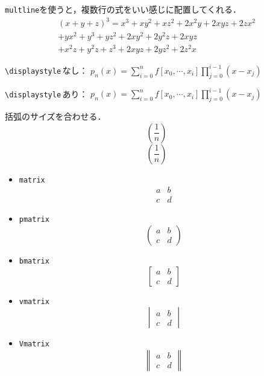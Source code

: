 \documentclass[uplatex]{jsarticle}
\begin{document}
\verb|multline|を使うと，複数行の式をいい感じに配置してくれる．
\begin{multline}
(x+y+z)^3=x^3+xy^2+xz^2+2x^2y+2xyz+2zx^2\\
+yx^2+y^3+yz^2+2xy^2+2y^2z+2xyz\\
+x^2z+y^2z+z^3+2xyz+2yz^2+2z^2x
\end{multline}

\verb|\displaystyle|\,なし：
$p_n(x) =\sum_{i=0}^n f[x_0,\cdots,x_i] \prod_{j=0}^{i-1}(x-x_j)$

\verb|\displaystyle|\,あり：
$\displaystyle p_n(x) =\sum_{i=0}^n f[x_0,\cdots,x_i] \prod_{j=0}^{i-1}(x-x_j)$

括弧のサイズを合わせる．
\begin{equation}
    (\frac{1}{n})
\end{equation}
\begin{equation}
    \left(\frac{1}{n}\right)
\end{equation}

\begin{itemize}
    \item \verb|matrix|
    \begin{equation}
    \begin{matrix}
        a & b \\
        c & d 
    \end{matrix}
    \end{equation}
    \item \verb|pmatrix|
    \begin{equation}
    \begin{pmatrix}
        a & b \\
        c & d 
    \end{pmatrix}
    \end{equation}
    \item \verb|bmatrix|
    \begin{equation}
    \begin{bmatrix}
        a & b \\
        c & d 
    \end{bmatrix}
    \end{equation}
    \item \verb|vmatrix|
    \begin{equation}
    \begin{vmatrix}
        a & b \\
        c & d 
    \end{vmatrix}
    \end{equation}
    \item \verb|Vmatrix|
    \begin{equation}
    \begin{Vmatrix}
        a & b \\
        c & d 
    \end{Vmatrix}
    \end{equation}
\end{itemize}
\end{document}
